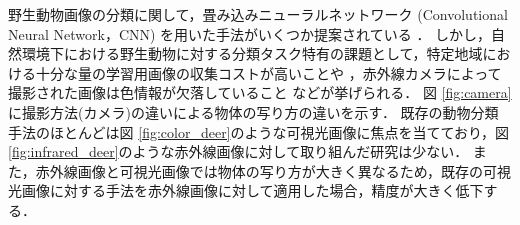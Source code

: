 野生動物画像の分類に関して，畳み込みニューラルネットワーク (Convolutional Neural Network，CNN) を用いた手法がいくつか提案されている \cite{manna2023,mohanty2022, agarwal2023, neeli2023}．
しかし，自然環境下における野生動物に対する分類タスク特有の課題として，特定地域における十分な量の学習用画像の収集コストが高いことや \cite{schneider2020}，赤外線カメラによって撮影された画像は色情報が欠落していること \cite{kishimoto2023}などが挙げられる．
図 \ref{fig:camera}に撮影方法(カメラ)の違いによる物体の写り方の違いを示す．
既存の動物分類手法のほとんどは図 \ref{fig:color_deer}のような可視光画像に焦点を当てており，図\ref{fig:infrared_deer}のような赤外線画像に対して取り組んだ研究は少ない．
また，赤外線画像と可視光画像では物体の写り方が大きく異なるため，既存の可視光画像に対する手法を赤外線画像に対して適用した場合，精度が大きく低下する．

